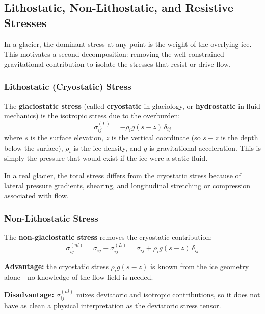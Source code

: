 \documentclass[11pt]{article}
\begin{document}
\subsection{Lithostatic, Non-Lithostatic, and Resistive Stresses}

In a glacier, the dominant stress at any point is the weight of the overlying ice.  This motivates a second decomposition: removing the well-constrained gravitational contribution to isolate the stresses that resist or drive flow.

\subsubsection*{Lithostatic (Cryostatic) Stress}

The \textbf{glaciostatic stress} (called \textbf{cryostatic} in glaciology, or \textbf{hydrostatic} in fluid mechanics) is the isotropic stress due to the overburden:
\begin{equation}
  \sigma_{ij}^{(L)} = -\rho_i g (s - z)\,\delta_{ij}
\end{equation}
where $s$ is the surface elevation, $z$ is the vertical coordinate (so $s - z$ is the depth below the surface), $\rho_i$ is the ice density, and $g$ is gravitational acceleration.  This is simply the pressure that would exist if the ice were a static fluid.

In a real glacier, the total stress differs from the cryostatic stress because of lateral pressure gradients, shearing, and longitudinal stretching or compression associated with flow.

\subsubsection*{Non-Lithostatic Stress}

The \textbf{non-glaciostatic stress} removes the cryostatic contribution:
\begin{equation}
  \sigma_{ij}^{(nl)} = \sigma_{ij} - \sigma_{ij}^{(L)} = \sigma_{ij} + \rho_i g (s-z)\,\delta_{ij}
\end{equation}

\textbf{Advantage:} the cryostatic stress $\rho_i g(s-z)$ is known from the ice geometry alone---no knowledge of the flow field is needed.

\textbf{Disadvantage:} $\sigma_{ij}^{(nl)}$ mixes deviatoric and isotropic contributions, so it does not have as clean a physical interpretation as the deviatoric stress tensor.
\end{document}
